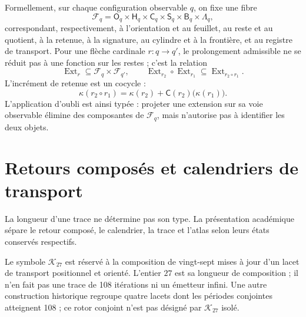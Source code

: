 Formellement, sur chaque configuration observable \(q\), on fixe une fibre
\[
 \mathcal F_q=
 \mathsf O_q\times\mathsf H_q\times\mathsf C_q\times
 \mathsf S_q\times\mathsf B_q\times\mathsf\Lambda_q,
\]
correspondant, respectivement, à l'orientation et au feuillet, au reste et au quotient,
à la retenue, à la signature, au cylindre et à la frontière, et au registre de transport. Pour une
flèche cardinale \(r:q\to q'\), le prolongement admissible ne se réduit pas à une
fonction sur les restes ; c'est la relation
\[
 \operatorname{Ext}_r\subseteq\mathcal F_q\times\mathcal F_{q'},
 \qquad
 \operatorname{Ext}_{r_2}\circ\operatorname{Ext}_{r_1}
 \subseteq\operatorname{Ext}_{r_2\circ r_1}.
\]
L'incrément de retenue est un cocycle :
\[
 \kappa(r_2\circ r_1)
 =\kappa(r_2)+\mathsf C(r_2)\bigl(\kappa(r_1)\bigr).
\]
L'application d'oubli est ainsi typée : projeter une extension sur sa voie
observable élimine des composantes de \(\mathcal F_q\), mais n'autorise pas à
identifier les deux objets.

\section{Retours composés et calendriers de transport}

La longueur d'une trace ne détermine pas son type. La présentation académique
sépare le retour composé, le calendrier, la trace et l'atlas selon leurs
états conservés respectifs.

Le symbole \(\mathcal K_{27}\) est réservé à la composition de
vingt-sept mises à jour d'un lacet de transport positionnel et orienté.
L'entier \(27\) est sa longueur de composition ; il n'en fait pas une
trace de 108 itérations ni un émetteur infini. Une autre construction historique
regroupe quatre lacets dont les périodes conjointes atteignent 108 ; ce rotor conjoint
n'est pas désigné par \(\mathcal K_{27}\) isolé.

